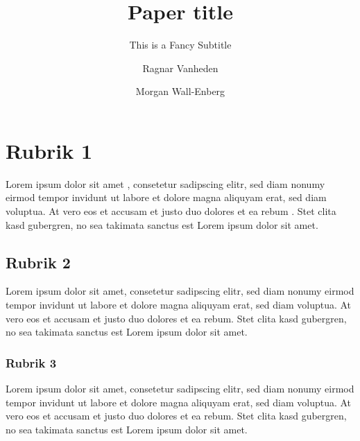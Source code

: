 \documentclass{shhpaper}
\title{Paper title}
\subtitle{This is a Fancy Subtitle}
\author{Ragnar Vanheden \and Morgan Wall-Enberg}
\begin{document}
\maketitle

\newpage 

\tableofcontents

\section{Rubrik 1}

Lorem ipsum dolor sit amet \textcite{Zak2010a}, consetetur sadipscing elitr, sed diam nonumy eirmod
tempor invidunt ut labore et dolore magna aliquyam erat, sed diam voluptua. At
vero eos et accusam et justo duo dolores et ea rebum \parencite{Yuyun2013}. Stet clita kasd gubergren,
no sea takimata sanctus est Lorem ipsum dolor sit amet.

\subsection{Rubrik 2}

Lorem ipsum dolor sit amet, consetetur sadipscing elitr, sed diam nonumy eirmod
tempor invidunt ut labore et dolore magna aliquyam erat, sed diam voluptua. At
vero eos et accusam et justo duo dolores et ea rebum. Stet clita kasd gubergren,
no sea takimata sanctus est Lorem ipsum dolor sit amet.

\subsubsection{Rubrik 3}

Lorem ipsum dolor sit amet, consetetur sadipscing elitr, sed diam nonumy eirmod
tempor invidunt ut labore et dolore magna aliquyam erat, sed diam voluptua. At
vero eos et accusam et justo duo dolores et ea rebum. Stet clita kasd gubergren,
no sea takimata sanctus est Lorem ipsum dolor sit amet.

\printbibliography[heading=bibintoc]
\end{document}
